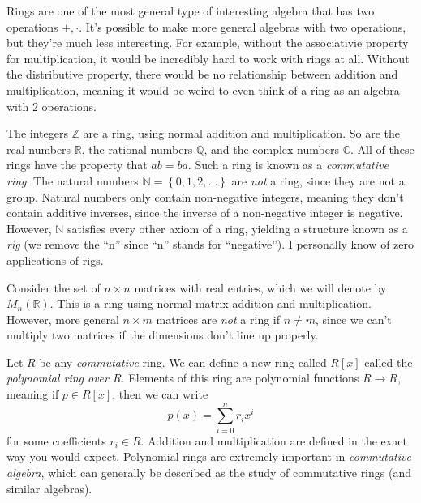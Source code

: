 Rings are one of the most general type of interesting algebra that has two operations $+,\cdot $. It's possible to make more general algebras with two operations, but they're much less interesting. For example, without the associativie property for multiplication, it would be incredibly hard to work with rings at all. Without the distributive property, there would be no relationship between addition and multiplication, meaning it would be weird to even think of a ring as an algebra with 2 operations.

\begin{example}\label{ex:ring-1}
	The integers $\mathbb{Z} $ are a ring, using normal addition and multiplication. So are the real numbers $\mathbb{R} $, the rational numbers $\mathbb{Q} $, and the complex numbers $\mathbb{C} $. All of these rings have the property that $ab=ba$. Such a ring is known as a \emph{commutative ring}. The natural numbers $\mathbb{N} =\left\{ 0,1,2, \ldots  \right\} $ are \emph{not} a ring, since they are not a group. Natural numbers only contain non-negative integers, meaning they don't contain additive inverses, since the inverse of a non-negative integer is negative. However, $\mathbb{N} $ satisfies every other axiom of a ring, yielding a structure known as a \emph{rig} (we remove the ``n'' since ``n'' stands for ``negative''). I personally know of zero applications of rigs.
\end{example}

\begin{example}\label{ex:ring-2}
	Consider the set of $n\times n$ matrices with real entries, which we will denote by $M_n(\mathbb{R} )$. This is a ring using normal matrix addition and multiplication. However, more general $n\times m$ matrices are \emph{not} a ring if $n \neq m$, since we can't multiply two matrices if the dimensions don't line up properly.
\end{example}

\begin{example}\label{ex:ring-3}
	Let $R$ be any \emph{commutative} ring. We can define a new ring called $R[x]$ called the \emph{polynomial ring over $R$}. Elements of this ring are polynomial functions $R\to R$, meaning if $p\in R[x]$, then we can write
	\[
		p(x) = \sum_{i=0}^n r_i x^i
	\]
	for some coefficients $r_i\in R$. Addition and multiplication are defined in the exact way you would expect. Polynomial rings are extremely important in \emph{commutative algebra}, which can generally be described as the study of commutative rings (and similar algebras).
\end{example}

